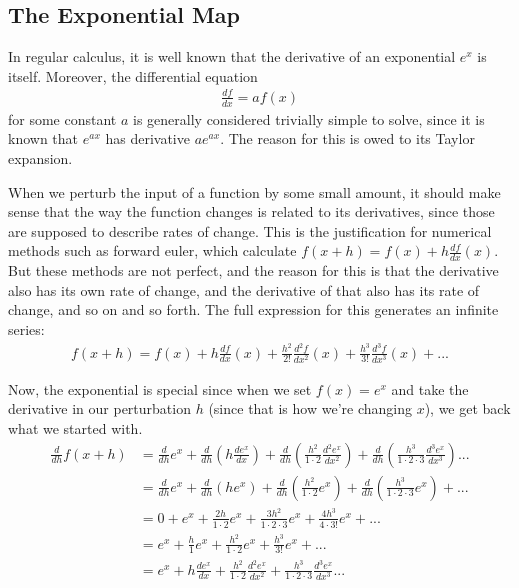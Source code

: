 \documentclass[11pt]{article}
\begin{document}
\subsection{The Exponential Map}
In regular calculus, it is well known that the derivative of an exponential $e^x$ is itself. Moreover, the differential equation \begin{gather*}
\frac{df}{dx} = a f(x)
\end{gather*}
for some constant $a$ is generally considered trivially simple to solve, since it is known that $e^{ax}$ has derivative $a e^{ax}$. The reason for this is owed to its Taylor expansion.

When we perturb the input of a function by some small amount, it should make sense that the way the function changes is related to its derivatives, since those are supposed to describe rates of change. This is the justification for numerical methods such as forward euler, which calculate $f(x+h) = f(x) + h\frac{df}{dx}(x)$. But these methods are not perfect, and the reason for this is that the derivative also has its own rate of change, and the derivative of that also has its rate of change, and so on and so forth. The full expression for this generates an infinite series: \begin{gather*}
f(x+h) = f(x) + h\frac{df}{dx}(x) + \frac{h^2}{2!} \frac{d^2 f}{dx^2}(x) + \frac{h^3}{3!}\frac{d^3f}{dx^3}(x) + ... 
\end{gather*}

Now, the exponential is special since when we set $f(x) = e^x$ and take the derivative in our perturbation $h$ (since that is how we're changing $x$), we get back what we started with. \begin{align*}
\frac{d}{dh} f(x + h) &= \frac{d}{dh}e^x + \frac{d}{dh} \left( h \frac{de^x}{dx}\right) + \frac{d}{dh} \left( \frac{h^2}{1\cdot 2} \frac{d^2e^x}{dx^2}\right) + \frac{d}{dh}\left(\frac{h^3}{1\cdot 2\cdot 3} \frac{d^3 e^x}{dx^3}\right) ... \\
&= \frac{d}{dh}e^x + \frac{d}{dh} \left( h e^x\right) + \frac{d}{dh} \left( \frac{h^2}{1\cdot 2} e^x\right) + \frac{d}{dh}\left(\frac{h^3}{1\cdot 2\cdot 3} e^x \right) + ... \\
&= 0 + e^x + \frac{2h}{1\cdot 2} e^x + \frac{3h^2}{1\cdot 2\cdot 3} e^x + \frac{4h^3}{4 \cdot 3!} e^x + ... \\
&= e^x + \frac{h}{1} e^x + \frac{h^2}{1\cdot 2} e^x + \frac{h^3}{3!} e^x + ... \\
&= e^x + h \frac{de^x}{dx} + \frac{h^2}{1\cdot 2} \frac{d^2e^x}{dx^2} + \frac{h^3}{1\cdot 2\cdot 3} \frac{d^3 e^x}{dx^3} ... \\
\end{align*}
\end{document}
